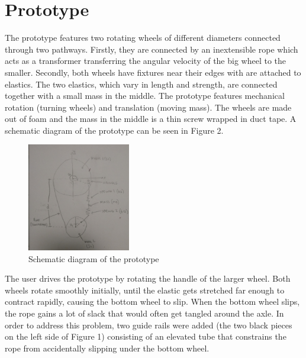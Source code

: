 \documentclass[twoside,twocolumn]{article}
\begin{document}
\section{Prototype}

The prototype features two rotating wheels of different diameters connected through two pathways. Firstly, they are connected by an inextensible rope which acts as a transformer transferring the angular velocity of the big wheel to the smaller. Secondly, both wheels have fixtures near their edges with are attached to elastics. The two elastics, which vary in length and strength, are connected together with a small mass in the middle. The prototype features mechanical rotation (turning wheels) and translation (moving mass). The wheels are made out of foam and the mass in the middle is a thin screw wrapped in duct tape. A schematic diagram of the prototype can be seen in Figure 2.

\begin{figure}[!h]
    \caption{Schematic diagram of the prototype}
    \centering
        \includegraphics[width=0.4\textwidth]{schematic.jpg}
\end{figure}

The user drives the prototype by rotating the handle of the larger wheel. Both wheels rotate smoothly initially, until the elastic gets stretched far enough to contract rapidly, causing the bottom wheel to slip. When the bottom wheel slips, the rope gains a lot of slack that would often get tangled around the axle. In order to address this problem, two guide rails were added (the two black pieces on the left side of Figure 1) consisting of an elevated tube that constrains the rope from accidentally slipping under the bottom wheel.



\end{document}

